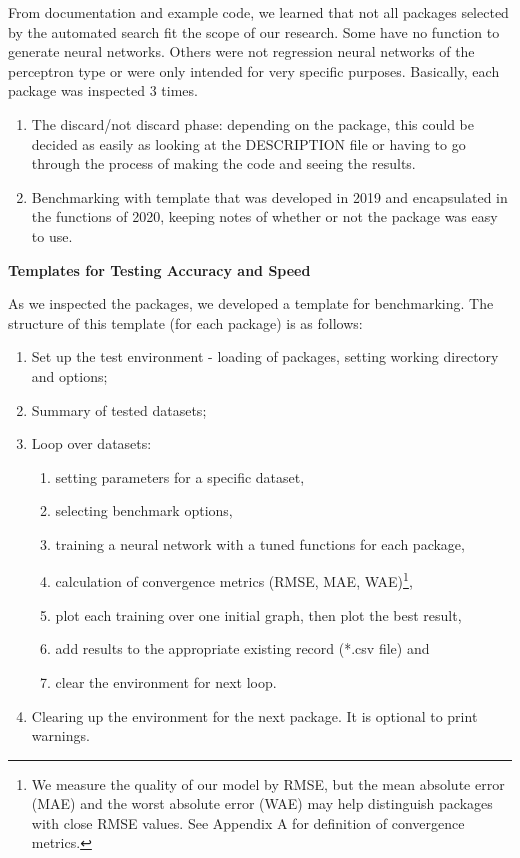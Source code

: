 From documentation and example code, we learned that not all packages
selected by the automated search fit the scope of our research. Some
have no function to generate neural networks. Others were not regression
neural networks of the perceptron type or were only intended for very
specific purposes. Basically, each package was inspected 3 times.

\begin{enumerate}
\def\labelenumi{\arabic{enumi}.}
\item
  The discard/not discard phase: depending on the package, this could be
  decided as easily as looking at the DESCRIPTION file or having to go
  through the process of making the code and seeing the results.
\item
  Benchmarking with template that was developed in 2019 and encapsulated
  in the functions of 2020, keeping notes of whether or not the package
  was easy to use.
\end{enumerate}

\textbf{Templates for Testing Accuracy and Speed}

As we inspected the packages, we developed a template for benchmarking.
The structure of this template (for each package) is as follows:

\begin{enumerate}
\def\labelenumi{\arabic{enumi}.}
\tightlist
\item
  Set up the test environment - loading of packages, setting working
  directory and options;
\item
  Summary of tested datasets;
\item
  Loop over datasets:

  \begin{enumerate}
  \def\labelenumii{\alph{enumii}.}
  \tightlist
  \item
    setting parameters for a specific dataset,
  \item
    selecting benchmark options,
  \item
    training a neural network with a tuned functions for each package,
  \item
    calculation of convergence metrics (RMSE, MAE, WAE)\footnote{We
      measure the quality of our model by RMSE, but the mean absolute
      error (MAE) and the worst absolute error (WAE) may help
      distinguish packages with close RMSE values. See Appendix A for
      definition of convergence metrics.},
  \item
    plot each training over one initial graph, then plot the best
    result,
  \item
    add results to the appropriate existing record (*.csv file) and
  \item
    clear the environment for next loop.
  \end{enumerate}
\item
  Clearing up the environment for the next package. It is optional to
  print warnings.
\end{enumerate}

